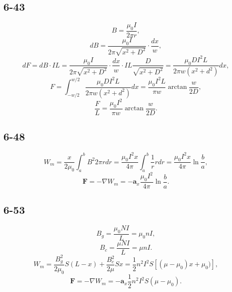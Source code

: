 \documentclass[6pt,a4paper]{article}
\begin{document}
\subsection{6-43}
$$B=\frac{\mu_0I}{2\pi r},$$
$$dB=\frac{\mu_0I}{2\pi \sqrt{x^2+D^2}}\cdot\frac{dx}{w},$$
$$dF=dB\cdot IL=\frac{\mu_0I}{2\pi \sqrt{x^2+D^2}}\cdot\frac{dx}{w}\cdot IL\frac{D}{\sqrt{x^2+D^2}}=\frac{\mu_0DI^2L}{2\pi w(x^2+d^2)}dx,$$
$$F=\int_{-w/2}^{w/2}\frac{\mu_0DI^2L}{2\pi w(x^2+d^2)}dx=\frac{\mu_0I^2L}{\pi w}\arctan\frac{w}{2D},$$
$$\frac{F}{L}=\frac{\mu_0I^2}{\pi w}\arctan\frac{w}{2D}.$$

\subsection{6-48}
$$W_m=\frac{x}{2\mu_0}\int_a^bB^2 2\pi rdr=\frac{\mu_0I^2x}{4\pi}\int_a^b\frac{1}{r}rdr=\frac{\mu_0I^2x}{4\pi}\ln\frac{b}{a},$$
$$\mathbf{F}=-\nabla W_m=-\mathbf{a}_x\frac{\mu_0I^2}{4\pi}\ln\frac{b}{a}.$$

\subsection{6-53}
$$B_g=\frac{\mu_0 NI}{L}=\mu_0 nI,$$
$$B_c=\frac{\mu NI}{L}=\mu nI.$$
$$W_m=\frac{B_g^2}{2\mu_0}S(L-x)+\frac{B_c^2}{2\mu}Sx=\frac{1}{2}n^2I^2S[(\mu-\mu_0)x+\mu_0)],$$
$$\mathbf{F}=-\nabla W_m=-\mathbf{a}_x\frac{1}{2}n^2I^2S(\mu-\mu_0).$$
\end{document}

